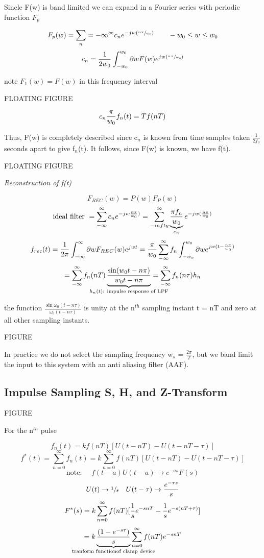 \documentclass[11pt,fleqn]{book} %
\begin{document}
Sincle F(w) is band limited we can expand in a Fourier series with periodic function $F_p$

$$F_p(w)=\sum_n={-\infty}^\infty c_ne^{-jw(\sfrac{n\pi}{w_0})}\qquad -w_0\leq w\leq w_0$$
$$c_n={1\over 2w_0}\int_{-w_0}^{w_0}\partial wF(w)e^{jw(\sfrac{n\pi}{w_0})}$$

note $F_1(w)=F(w)$ in this frequency interval

FLOATING FIGURE

$$c_n{\pi\over w_0}f_n(t)=Tf(nT)$$

Thus, F(w) is completely described since c$_n$ is known from time samples taken $\frac{1}{2f_0}$ seconds apart to give f$_n$(t). It follows, since F(w) is known, we have f(t).

FLOATING FIGURE

\textit{Reconstruction of f(t)}

$$F_{REC}(w)=P(w)F_P(w)$$
$$\text{ideal filter }=\sum_{-\infty}^\infty c_ne^{-jw{n\pi\over w_0})}=\sum_{-infty}^\infty \underbrace{\pi f_n\over w_0}_{c_n} e^{-jw({n\pi\over w_0})}$$
$$f_{rec}(t)={1\over 2\pi}\int_{-\infty}^\infty\partial wF_{REC}(w)e^{jwt}={\pi\over w_0}\sum_{-\infty}^\infty f_n\int_{-w_o}^{w_0}\partial w e^{jw(t-{n\pi\over w_0})}$$
$$=\sum_{-\infty}^{\infty}f_n(nT) \underbrace{\sin(w_0t-n\pi)\over w_0t-n\pi}_{\mathclap{h_n(t)\text{: impulse response of LPF}}}=\sum_{-\infty}^\infty f_n(n\tau)h_n$$

the function $\frac{\sin\omega_0(t-n\tau)}{\omega_0(t-n\tau)}$ is unity at the n$^{th}$ sampling instant t = nT and zero at all other sampling instants.

FIGURE

In practice we do not select the sampling frequency w$_s$ = $\frac{2\pi}{T}$, but we band limit the input to this system with an anti aliasing filter (AAF).

\subsection{Impulse Sampling S, H, and Z-Transform}

FIGURE

For the n$^{th}$ pulse

$$f_n(t)=kf(nT)[U(t-nT)-U(t-nT-\tau)]$$
$$f^*(t)=\sum_{n=0}^\infty f_n(t)=k\sum_{n=0}^\infty f(nT)[U(t-nT)-U(t-nT-\tau)]$$
$$\text{note: }\quad f(t-a)U(t-a)\to e^{-as}F(s)$$
$$U(t)\to \sfrac{1}{s}\quad U(t-\tau)\to {e^{-\tau s}\over s}$$
$$F^*(s)=k\sum_{n=0}^\infty f(nT)[{1\over s} e^{-snT}-{1\over s}e^{-s(nT+\tau)}]$$
$$=k\underbrace{(1-e^{-s\tau})\over s}_{\mathclap{\text{tranform function\\of clamp device}}}\sum_{n=0}^\infty f(nT)e^{-snT}$$
\end{document}
